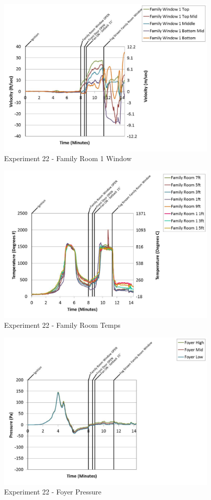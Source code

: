 \documentclass{article}
\begin{document}
\begin{appendices}
	\begin{figure}[h!]
		\centering
		\includegraphics[height=3.05in]{0_Images/Results_Charts/Exp_22_Charts/FamilyRoom1Window.pdf}
		\caption{Experiment 22 - Family Room 1 Window}
	\end{figure}
 
	\clearpage

	\begin{figure}[h!]
		\centering
		\includegraphics[height=3.05in]{0_Images/Results_Charts/Exp_22_Charts/FamilyRoomTemps.pdf}
		\caption{Experiment 22 - Family Room Temps}
	\end{figure}
 

	\begin{figure}[h!]
		\centering
		\includegraphics[height=3.05in]{0_Images/Results_Charts/Exp_22_Charts/FoyerPressure.pdf}
		\caption{Experiment 22 - Foyer Pressure}
	\end{figure}
 

\end{appendices}
\end{document}
